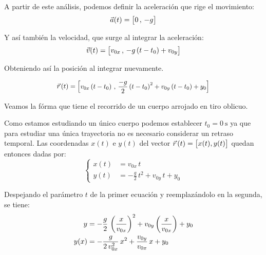A partir de este análisis, podemos definir la aceleración que rige el movimiento:
\begin{equation*}
    \Vec{a}(t) = { \begin{bmatrix} 0 \, , \, -g \end{bmatrix} }
\end{equation*}

Y así también la velocidad, que surge al integrar la aceleración:
\begin{equation*}
    \Vec{v}(t) = { \begin{bmatrix} v_{0x} \, , \, -g \left(t-t_0\right) + v_{0y} \end{bmatrix} }
\end{equation*}

Obteniendo así la posición al integrar nuevamente.

\begin{mdframed}[style=DefinitionFrame]
    \begin{defn}
    \end{defn}
    \begin{equation*}
        \scale{0.92}{
        \xyz(t) = \inBrackets{v_{0x} \left(t-t_0\right) \, , \, \frac{-g}{2} \left(t-t_0\right)^2 + v_{0y} \left(t-t_0\right) + y_0}
        }
    \end{equation*}
\end{mdframed}

Veamos la fórma que tiene el recorrido de un cuerpo arrojado en tiro oblicuo.

Como estamos estudiando un único cuerpo podemos establecer $t_0=\SI{0}{\second}$ ya que para estudiar una única trayectoria no es necesario considerar un retraso temporal.
Las coordenadas $x(t)$ e $y(t)$ del vector $\vec{r}\hspace{0.05cm}(t) = { \begin{bmatrix} x(t),y(t) \end{bmatrix} }$ quedan entonces dadas por:
\begin{equation*}
    \left\{
    \begin{aligned}
        x(t) &= v_{0x} \, t
        \\
        y(t) &= -\frac{g}{2} \, t^2 + v_{0y} \, t + y_0
    \end{aligned}
    \right.
\end{equation*}

Despejando el parámetro $t$ de la primer ecuación y reemplazándolo en la segunda, se tiene:
\begin{align}
    y &= -\frac{g}{2} \, \left(\frac{x}{v_{0x}}\right)^2 + v_{0y} \left(\frac{x}{v_{0x}}\right) + y_0
    \notag
    \\
    y(x) &= -\frac{g}{2 \, v_{0x}^2} \, x^2 + \frac{v_{0y}}{v_{0x}} \, x + y_0
    \label{eqn:oblicuoCurva}
\end{align}

